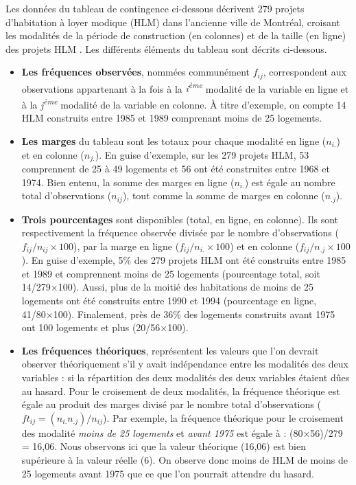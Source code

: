 \documentclass[
  11pt,
  french,
]{book}
\begin{document}
Les données du tableau de contingence ci-dessous décrivent 279 projets d'habitation à loyer modique (HLM) dans l'ancienne ville de Montréal, croisant les modalités de la période de construction (en colonnes) et de la taille (en ligne) des projets HLM \citep{TheseApparicio}. Les différents éléments du tableau sont décrits ci-dessous.

\begin{itemize}
\item
  \textbf{Les fréquences observées}, nommées communément \(f_{ij}\), correspondent aux observations appartenant à la fois à la \emph{i\textsuperscript{ème}} modalité de la variable en ligne et à la \emph{j\textsuperscript{ème}} modalité de la variable en colonne. À titre d'exemple, on compte 14 HLM construits entre 1985 et 1989 comprenant moins de 25 logements.
\item
  \textbf{Les marges} du tableau sont les totaux pour chaque modalité en ligne (\(n_{i.}\)) et en colonne (\(n_{j.}\)). En guise d'exemple, sur les 279 projets HLM, 53 comprennent de 25 à 49 logements et 56 ont été construites entre 1968 et 1974. Bien entenu, la somme des marges en ligne (\(n_{i.}\)) est égale au nombre total d'observations (\(n_{ij}\)), tout comme la somme de marges en colonne (\(n_{.j}\)).
\item
  \textbf{Trois pourcentages} sont disponibles (total, en ligne, en colonne). Ils sont respectivement la fréquence observée divisée par le nombre d'observations (\(f_{ij}/n_{ij}\times100\)), par la marge en ligne (\(f_{ij}/n_{i.} \times 100\)) et en colonne (\(f_{ij}/n_{.j}\times100\)). En guise d'exemple, 5\% des 279 projets HLM ont été construits entre 1985 et 1989 et comprennent moins de 25 logements (pourcentage total, soit 14/279×100). Aussi, plus de la moitié des habitations de moins de 25 logements ont été construits entre 1990 et 1994 (pourcentage en ligne, 41/80×100). Finalement, près de 36\% des logements construits avant 1975 ont 100 logements et plus (20/56×100).
\item
  \textbf{Les fréquences théoriques}, représentent les valeurs que l'on devrait observer théoriquement s'il y avait indépendance entre les modalités des deux variables : si la répartition des deux modalités des deux variables étaient dûes au hasard. Pour le croisement de deux modalités, la fréquence théorique est égale au produit des marges divisé par le nombre total d'observations (\(ft_{ij} = (n_{i.}n_{.j})/n_{ij}\)). Par exemple, la fréquence théorique pour le croisement des modalité \emph{moins de 25 logements} et \emph{avant 1975} est égale à : (80×56)/279 = 16,06. Nous observons ici que la valeur théorique (16,06) est bien supérieure à la valeur réelle (6). On observe donc moins de HLM de moins de 25 logements avant 1975 que ce que l'on pourrait attendre du hasard.

\end{itemize}
\end{document}
